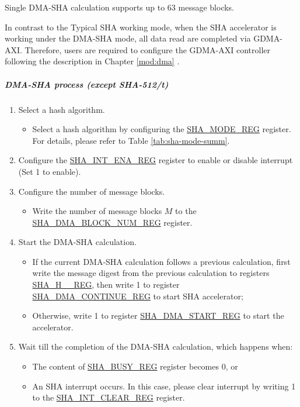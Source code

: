 \documentclass[main\_\_EN.tex]{subfiles}
\begin{document}
Single DMA-SHA calculation supports up to 63 message blocks.

In contrast to the Typical SHA working mode, when the SHA accelerator is working under the DMA-SHA mode, all data read are completed via GDMA-AXI. Therefore, users are required to configure the GDMA-AXI controller following the description in Chapter \ref{mod:dma} \textit{}.

\subparagraph{DMA-SHA process (except SHA-512/{\it{t}})}

\begin{enumerate}
    \item Select a hash algorithm.
    \begin{itemize}
        \item Select a hash algorithm by configuring the \hyperref[regdesc:SHAMODEREG]{SHA\_MODE\_REG} register. For details, please refer to Table \ref{tab:sha-mode-summ}.
    \end{itemize}
    \item Configure the \hyperref[regdesc:SHAINTENAREG]{SHA\_INT\_ENA\_REG} register to enable or disable interrupt (Set 1 to enable).
    \item Configure the number of message blocks.
    \begin{itemize}
        \item  Write the number of message blocks \begin{math}M\end{math} to the  \hyperref[regdesc:SHADMABLOCKNUMREG]{SHA\_DMA\_BLOCK\_NUM\_REG} register.
    \end{itemize}
    \item Start the DMA-SHA calculation.
        \begin{itemize}
            \item If the current DMA-SHA calculation follows a previous calculation, first write the message digest from the previous calculation to registers \hyperref[regdesc:SHAHNREG]{SHA\_H\_\_REG}, then write 1 to register \hyperref[regdesc:SHADMACONTINUEREG]{SHA\_DMA\_CONTINUE\_REG} to start SHA accelerator;
            \item Otherwise, write 1 to register \hyperref[regdesc:SHADMASTARTREG]{SHA\_DMA\_START\_REG} to start the accelerator.
        \end{itemize}
    \item Wait till the completion of the DMA-SHA calculation, which happens when:
        \begin{itemize}
            \item The content of \hyperref[regdesc:SHABUSYREG]{SHA\_BUSY\_REG} register becomes 0, or
            \item An SHA interrupt occurs. In this case, please clear interrupt by writing 1 to the \hyperref[regdesc:SHAINTCLEARREG]{SHA\_INT\_CLEAR\_REG} register.
        \end{itemize}


\end{enumerate}
\end{document}
